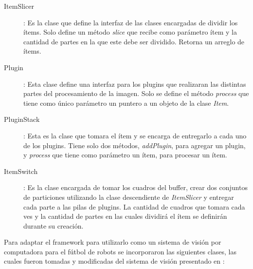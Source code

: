 \begin{description}
\item[ItemSlicer]: Es la clase que define la interfaz de las clases encargadas
	de dividir los ítems. Solo define un método \emph{slice} que recibe como
	parámetro ítem y la cantidad de partes en la que este debe ser dividido.
	Retorna un arreglo de ítems.

\item[Plugin]: Esta clase define una interfaz para los plugins que realizaran
	las distintas partes del procesamiento de la imagen. Solo se define el
	método \emph{process} que tiene como único parámetro un puntero a un
	objeto de la clase \emph{Item}.

\item[PluginStack]: Esta es la clase que tomara el ítem y se encarga de
	entregarlo a cada uno de los plugins. Tiene solo dos métodos,
	\emph{addPlugin}, para agregar un plugin, y \emph{process} que tiene
	como parámetro un ítem, para procesar un ítem.

\item[ItemSwitch]: Es la clase encargada de tomar los cuadros del buffer, crear
	dos conjuntos de particiones utilizando la clase descendiente de
	\emph{ItemSlicer} y entregar cada parte a las pilas de plugins. La
	cantidad de cuadros que tomara cada ves y la cantidad de partes en las
	cuales dividirá el ítem se definirán durante su creación.

\end{description}

Para adaptar el framework para utilizarlo como un sistema de visión por
computadora para el fútbol de robots se incorporaron las siguientes clases, las
cuales fueron tomadas y modificadas del sistema de visión presentado en
\cite{torres2014}:


